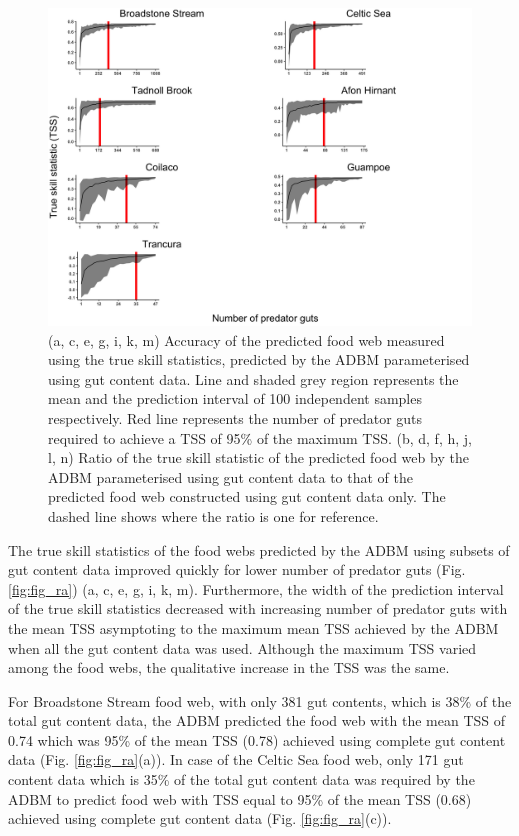 \documentclass{article}
\begin{document}
\begin{figure}

{\centering \includegraphics[width=500px]{../../results/misc/plot_TSS_ratio} 

}

\caption{\label{fig:fig_ra} (a, c, e, g, i, k, m) Accuracy of the predicted food web measured using the true skill statistics, predicted by the ADBM parameterised using gut content data. Line and shaded grey region represents the mean and the prediction interval of 100 independent samples respectively. Red line represents the number of predator guts required to achieve a TSS of 95\% of the maximum TSS. (b, d, f, h, j, l, n) Ratio of the true skill statistic of the predicted food web by the ADBM parameterised using gut content data to that of the predicted food web constructed using gut content data only. The dashed line shows where the ratio is one for reference.}\label{fig:unnamed-chunk-2}
\end{figure}

The true skill statistics of the food webs predicted by the ADBM using
subsets of gut content data improved quickly for lower number of
predator guts (Fig. \ref{fig:fig_ra}) (a, c, e, g, i, k, m).
Furthermore, the width of the prediction interval of the true skill
statistics decreased with increasing number of predator guts with the
mean TSS asymptoting to the maximum mean TSS achieved by the ADBM when
all the gut content data was used. Although the maximum TSS varied among
the food webs, the qualitative increase in the TSS was the same.

For Broadstone Stream food web, with only 381 gut contents, which is
38\% of the total gut content data, the ADBM predicted the food web with
the mean TSS of 0.74 which was 95\% of the mean TSS (0.78) achieved
using complete gut content data (Fig. \ref{fig:fig_ra}(a)). In case of
the Celtic Sea food web, only 171 gut content data which is 35\% of the
total gut content data was required by the ADBM to predict food web with
TSS equal to 95\% of the mean TSS (0.68) achieved using complete gut
content data (Fig. \ref{fig:fig_ra}(c)).
\end{document}
